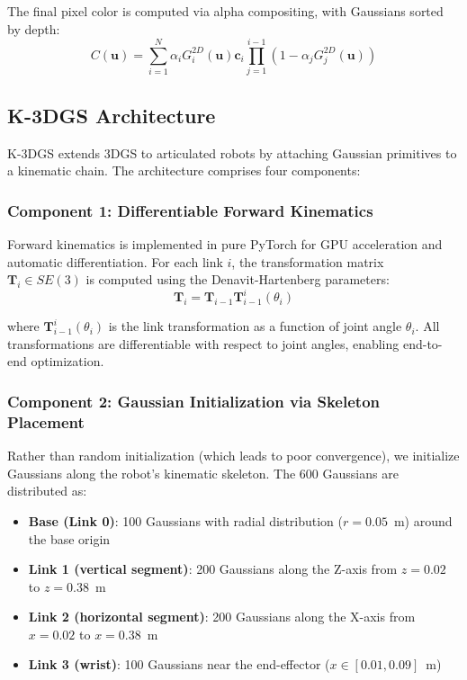 \documentclass[12pt,a4paper,oneside]{report}
\begin{document}
The final pixel color is computed via alpha compositing, with Gaussians sorted by depth:
\begin{equation}C(\mathbf{u}) = \sum_{i=1}^{N} \alpha_i G_i^{2D}(\mathbf{u}) \mathbf{c}_i \prod_{j=1}^{i-1} (1 - \alpha_j G_j^{2D}(\mathbf{u}))
\end{equation}
\subsection{K-3DGS Architecture}
\label{subsec:k_3dgs_architecture}

K-3DGS extends 3DGS to articulated robots by attaching Gaussian primitives to a kinematic chain. The architecture comprises four components:
\subsubsection{Component 1: Differentiable Forward Kinematics}
\label{subsubsec:component_1_differentiable_forward_kinematics}

Forward kinematics is implemented in pure PyTorch for GPU acceleration and automatic differentiation. For each link $i$, the transformation matrix $\mathbf{T}_i \in SE(3)$ is computed using the Denavit-Hartenberg parameters:
\begin{equation}\mathbf{T}_i = \mathbf{T}_{i-1} \mathbf{T}_{i-1}^{i}(\theta_i)
\label{eq:dh_transform_chain}
\end{equation}

where $\mathbf{T}_{i-1}^{i}(\theta_i)$ is the link transformation as a function of joint angle $\theta_i$. All transformations are differentiable with respect to joint angles, enabling end-to-end optimization.
\subsubsection{Component 2: Gaussian Initialization via Skeleton Placement}
\label{subsubsec:component_2_gaussian_initialization_via_skeleton_placement}

Rather than random initialization (which leads to poor convergence), we initialize Gaussians along the robot's kinematic skeleton. The 600 Gaussians are distributed as:
\begin{itemize}
    \item \textbf{Base (Link 0)}: 100 Gaussians with radial distribution ($r = 0.05$~m) around the base origin

    \item \textbf{Link 1 (vertical segment)}: 200 Gaussians along the Z-axis from $z=0.02$ to $z=0.38$~m

    \item \textbf{Link 2 (horizontal segment)}: 200 Gaussians along the X-axis from $x=0.02$ to $x=0.38$~m

    \item \textbf{Link 3 (wrist)}: 100 Gaussians near the end-effector ($x \in [0.01, 0.09]$~m)
\end{itemize}
\end{document}
